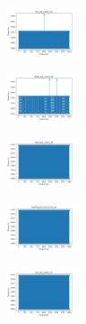 \vspace*{\fill}
\newpage
\vspace*{\fill}

\begin{figure}[H]    
    \centering
    \begin{subfigure}
        \centering
        \includegraphics[width=0.234\textwidth]{img/agesf/iris_set_const_10_949004259_time.png}
    \end{subfigure}
    \hfill
    \begin{subfigure}
        \centering
        \includegraphics[width=0.234\textwidth]{img/agesf/ecoli_set_const_10_949004259_time.png}
    \end{subfigure}
    \hfill
    \begin{subfigure}
        \centering
        \includegraphics[width=0.234\textwidth]{img/agesf/rand_set_const_10_949004259_time.png}
    \end{subfigure}
    \hfill
    \begin{subfigure}
        \centering
        \includegraphics[width=0.234\textwidth]{img/agesf/newthyroid_set_const_10_949004259_time.png}
    \end{subfigure}
    \hfill
    \begin{subfigure}
        \centering
        \includegraphics[width=0.234\textwidth]{img/agesf/iris_set_const_10_589741062_time.png}

\end{subfigure}
\end{figure}
